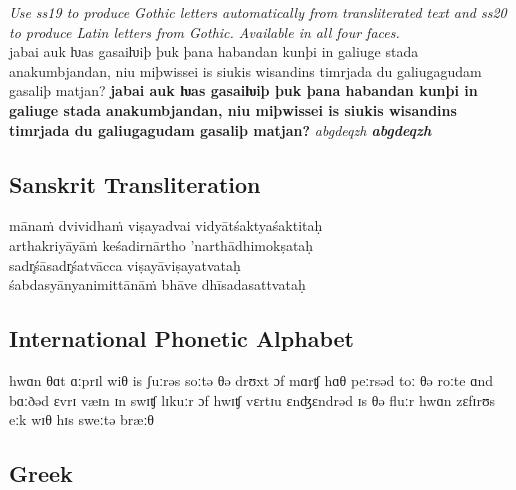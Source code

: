 \documentclass[12pt,a4paper,openany]{book}
\begin{document}
{\noindent\small\itshape Use ss19 to produce Gothic letters
  automatically from transliterated text and ss20 to produce Latin
  letters from Gothic. Available in all four faces.}\\[1ex]
{jabai auk ƕas gasaiƕiþ þuk þana
  habandan kunþi in ga\-liuge stada anakumbjandan, niu miþwissei is
  siukis wis\-an\-dins timrjada du galiugagudam gasaliþ matjan?
  {\bfseries jabai auk ƕas gasaiƕiþ þuk þana habandan kunþi in
    ga\-liuge stada anakumbjandan, niu miþwissei is siukis
    wis\-an\-dins timrjada du galiugagudam gasaliþ matjan?}
  \textit{abgdeqzh \bfseries abgdeqzh}}

\subsection*{Sanskrit Transliteration}

\noindent mānaṁ dvividhaṁ viṣayadvai vidyātśaktyaśaktitaḥ \\
     arthakriyāyāṁ keśadirnārtho ’narthādhimokṣataḥ\\[1ex]
sadr̥śāsadr̥śatvācca viṣayāviṣayatvataḥ \\
     śabdasyānyanimittānāṁ bhāve dhīsadasattvataḥ

\subsection*{International Phonetic Alphabet}
hwɑn θɑt ɑːprɪl wiθ is ʃuːrəs soːtə θə drʊxt ɔf mɑrʧ hɑθ peːrsəd toː
θə roːte ɑnd bɑːðəd ɛvrɪ væɪn ɪn swɪʧ lɪkuːr ɔf hwɪʧ vɛrtɪu
ɛnʤɛndrəd ɪs θə fluːr hwɑn zɛfɪrʊs eːk wɪθ hɪs sweːtə bræːθ

\subsection*{Greek}
\end{document}
